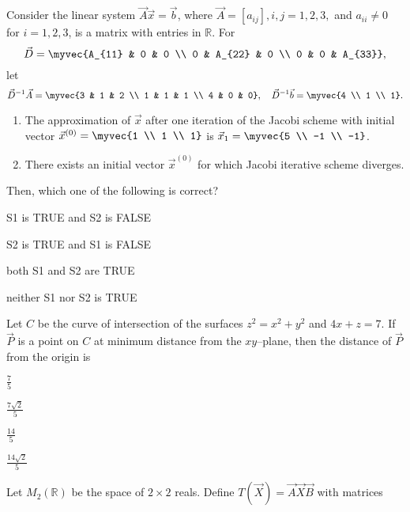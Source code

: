 \item Consider the linear system $\vec{A}\vec{x}=\vec{b}$, where $\vec{A}=[a_{ij}], i,j=1,2,3,$ and $a_{ii}\neq 0$ for $i=1,2,3$, is a matrix with entries in $\mathbb{R}$.  
For 
$$
\vec{D}=\myvec{A_{11} & 0 & 0 \\ 0 & A_{22} & 0 \\ 0 & 0 & A_{33}},
$$  
let  
$$
\vec{D}^{-1}\vec{A} = \myvec{3 & 1 & 2 \\ 1 & 1 & 1 \\ 4 & 0 & 0}, \quad \vec{D}^{-1}\vec{b} = \myvec{4 \\ 1 \\ 1}.
$$  
\begin{enumerate}[label=S\arabic*:]
	\item The approximation of $\vec{x}$ after one iteration of the Jacobi scheme with initial vector $\vec{x}^{(0)}=\myvec{1 \\ 1 \\ 1}$ is $\vec{x}_1=\myvec{5 \\ -1 \\ -1}$.  
	\item There exists an initial vector $\vec{x}^{(0)}$ for which Jacobi iterative scheme diverges.  
\end{enumerate}
Then, which one of the following is correct?  
\hfill{}
\begin{enumerate}
\begin{multicols}{2}
\item S1 is TRUE and S2 is FALSE
\item S2 is TRUE and S1 is FALSE
\item both S1 and S2 are TRUE
\item neither S1 nor S2 is TRUE
\end{multicols}
\end{enumerate}
\item Let $C$ be the curve of intersection of the surfaces $z^2=x^2+y^2$ and $4x+z=7$.  
If $\vec{P}$ is a point on $C$ at minimum distance from the $xy$–plane, then the distance of $\vec{P}$ from the origin is  
\hfill{}
\begin{enumerate}
\begin{multicols}{2}
\item $\tfrac{7}{5}$
\item $\tfrac{7\sqrt{2}}{5}$
\item $\tfrac{14}{5}$
\item $\tfrac{14\sqrt{2}}{5}$
\end{multicols}
\end{enumerate}
\item Let $M_2(\mathbb{R})$ be the space of $2\times 2$ reals. Define $T(\vec{X})=\vec{A}\vec{X}\vec{B}$ with matrices  

